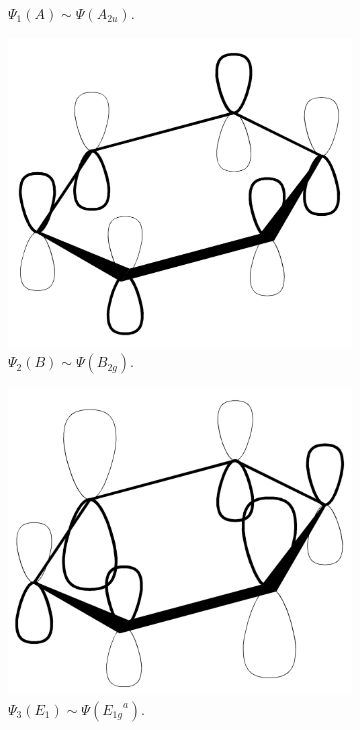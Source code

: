\documentclass[../notes.tex]{subfiles}
\begin{document}
\begin{itemize}
\begin{itemize}
\begin{figure}[h!]
\begin{subfigure}[b]{0.25\linewidth}
                \caption{$\Psi_1(A)\sim\Psi(A_{2u})$.}
                \label{fig:benzeneMOsa}
            \end{subfigure}
            \begin{subfigure}[b]{0.25\linewidth}
                \centering
                \includegraphics[width=0.7\linewidth]{../ExtFiles/benzeneMOsb.png}
                \caption{$\Psi_2(B)\sim\Psi(B_{2g})$.}
                \label{fig:benzeneMOsb}
            \end{subfigure}
            \begin{subfigure}[b]{0.25\linewidth}
                \centering
                \includegraphics[width=0.7\linewidth]{../ExtFiles/benzeneMOsc.png}
                \caption{$\Psi_3(E_1)\sim\Psi({E_{1g}}^a)$.}
                \label{fig:benzeneMOsc}
            \end{subfigure}\\[1em]
            \begin{subfigure}[b]{0.25\linewidth}

\end{subfigure}
\end{figure}
\end{itemize}
\end{itemize}
\end{document}
